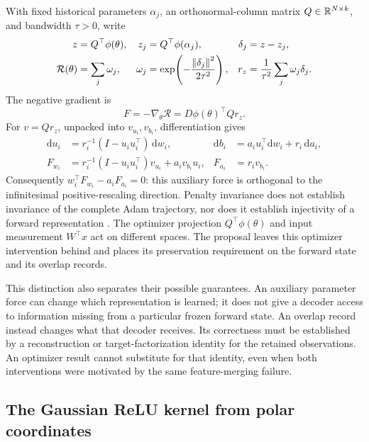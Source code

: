 With fixed historical parameters $\alpha_j$, an orthonormal-column matrix
$Q\in\mathbb R^{N\times k}$, and bandwidth $\tau>0$, write
\begin{align}
 z&=Q^\top\phi(\theta),& z_j&=Q^\top\phi(\alpha_j),&
 \delta_j&=z-z_j,\\
 \mathcal R(\theta)&=\sum_j\omega_j,&
 \omega_j&=\exp\!\left(-\frac{\left\lVert\delta_j\right\rVert^2}{2\tau^2}\right),&
 r_z&=\frac{1}{\tau^2}\sum_j\omega_j\delta_j.
 \label{qdo:anchor}
\end{align}
The negative gradient is
\begin{equation}
 F=-\nabla_\theta\mathcal R=D\phi(\theta)^\top Qr_z.
 \label{qdo:force}
\end{equation}
For $v=Qr_z$, unpacked into $v_{u_i},v_{b_i}$, differentiation gives
\begin{align}
 \mathrm du_i&=r_i^{-1}(I-u_i u_i^\top)\,\mathrm dw_i,&
 \mathrm db_i&=a_i u_i^\top\mathrm dw_i+r_i\,\mathrm da_i,\\
 F_{w_i}&=r_i^{-1}(I-u_i u_i^\top)v_{u_i}+a_i v_{b_i}u_i,&
 F_{a_i}&=r_i v_{b_i}.
 \label{qdo:pullback}
\end{align}
Consequently $w_i^\top F_{w_i}-a_iF_{a_i}=0$: this auxiliary force is
orthogonal to the infinitesimal positive-rescaling direction. Penalty
invariance does not establish invariance of the complete Adam trajectory,
nor does it establish injectivity of a forward representation \cite{qdo}.
The optimizer projection $Q^\top\phi(\theta)$ and input measurement $W^\top x$
act on different spaces. The proposal leaves this optimizer intervention
behind and places its preservation requirement on the forward state and its
overlap records.

This distinction also separates their possible guarantees. An auxiliary
parameter force can change which representation is learned; it does not give
a decoder access to information missing from a particular frozen forward
state. An overlap record instead changes what that decoder receives. Its
correctness must be established by a reconstruction or target-factorization
identity for the retained observations. An optimizer result cannot substitute
for that identity, even when both interventions were motivated by the same
feature-merging failure.

\subsection{The Gaussian ReLU kernel from polar coordinates}
\label{qdo:kernel}


